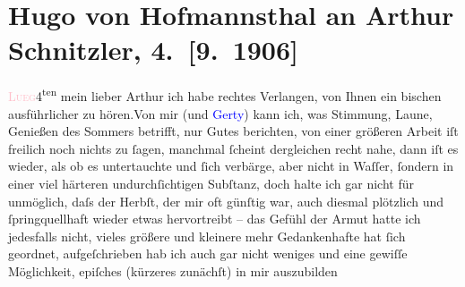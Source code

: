 

               \section[Hugo von Hofmannsthal an Arthur Schnitzler, 4. {[}9. 1906{]}]{ Hugo von Hofmannsthal an Arthur Schnitzler,
               4. {[}9. 1906{]}}\nopagebreak{}\rehead{ }\normalsize\beginnumbering{} \toendnotes[C]{\smallbreak\pagebreak[2]} 
\toendnotes[C]{\smallbreak}\pstart
           \raggedleft{}{\pb}\textcolor{pink}{\textsc{Lueg}}{}\ledrightnote{\textcolor{pink}{Lueg am Wolfgangsee}}{ }4\textsuperscript{ten}\pend
           \pstart{}mein lieber Arthur \pend\pstart
           ich habe rechtes Verlangen, von Ihnen ein bischen ausführlicher zu hören.\hspace*{1.5em}Von mir (und \textcolor{blue}{Gerty}{}\ledrightnote{\textcolor{blue}{Gertrude von Hofmannsthal}})
               kann ich, was Stimmung, Laune, Genießen des Sommers betrifft, nur Gutes berichten,
               von einer größeren Arbeit iſt freilich noch nichts zu ſagen, manchmal {\pb}ſcheint dergleichen recht nahe,
               dann iſt es wieder, als ob es untertauchte und ſich verbärge, aber nicht in Waſſer,
               ſondern in einer viel härteren undurchſichtigen Subſtanz, doch halte ich gar nicht
               für unmöglich, daſs der Herbſt, der mir oft günſtig war, auch diesmal plötzlich und
               ſpringquellhaft wieder etwas {\pb}hervortreibt – das Gefühl der Armut hatte ich jedesfalls nicht, vieles größere und
               kleinere mehr Gedankenhafte hat ſich geordnet, aufgeſchrieben hab ich auch gar nicht
               weniges und eine gewiſſe Möglichkeit, epiſches (kürzeres zunächſt) in mir auszubilden
